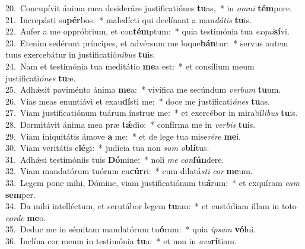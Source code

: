 {20.~}Concupívit ánima mea desideráre justificatiónes \textbf{tu}as,~* in \textit{om}\textit{ni} \textbf{tém}pore.\\
{21.~}Increpásti su\textbf{pér}bos:~* maledícti qui declínant a man\textit{dá}\textit{tis} \textbf{tu}is.\\
{22.~}Aufer a me oppróbrium, et con\textbf{tém}ptum:~* quia testimónia tua \textit{ex}\textit{qui}\textbf{sí}vi.\\
{23.~}Etenim sedérunt príncipes, et advérsum me loque\textbf{bán}tur:~* servus autem tuus exercebátur in justificatió\textit{ni}\textit{bus} \textbf{tu}is.\\
{24.~}Nam et testimónia tua meditátio \textbf{me}a est:~* et consílium meum justificati\textit{ó}\textit{nes} \textbf{tu}æ.\\
{25.~}Adhǽsit paviménto ánima \textbf{me}a:~* vivífica me secúndum \textit{ver}\textit{bum} \textbf{tu}um.\\
{26.~}Vias meas enuntiávi et exau\textbf{dí}sti me:~* doce me justificati\textit{ó}\textit{nes} \textbf{tu}as.\\
{27.~}Viam justificatiónum tuárum ínstru\textbf{e} me:~* et exercébor in mirabí\textit{li}\textit{bus} \textbf{tu}is.\\
{28.~}Dormitávit ánima mea præ \textbf{tǽ}dio:~* confírma me in \textit{ver}\textit{bis} \textbf{tu}is.\\
{29.~}Viam iniquitátis ámove \textbf{a} me:~* et de lege tua mise\textit{ré}\textit{re} \textbf{me}i.\\
{30.~}Viam veritátis e\textbf{lé}gi:~* judícia tua non \textit{sum} \textit{o}\textbf{blí}tus.\\
{31.~}Adhǽsi testimóniis tuis \textbf{Dó}mine:~* noli \textit{me} \textit{con}\textbf{fún}dere.\\
{32.~}Viam mandatórum tuórum cu\textbf{cúr}ri:~* cum dilatá\textit{sti} \textit{cor} \textbf{me}um.\\
{33.~}Legem pone mihi, Dómine, viam justificatiónum tu\textbf{á}rum:~* et exquíram \textit{e}\textit{am} \textbf{sem}per.\\
{34.~}Da mihi intelléctum, et scrutábor legem \textbf{tu}am:~* et custódiam illam in toto \textit{cor}\textit{de} \textbf{me}o.\\
{35.~}Deduc me in sémitam mandatórum tu\textbf{ó}rum:~* quia \textit{i}\textit{psam} \textbf{vó}lui.\\
{36.~}Inclína cor meum in testimónia \textbf{tu}a:~* et non in \textit{a}\textit{va}\textbf{rí}tiam.\\
